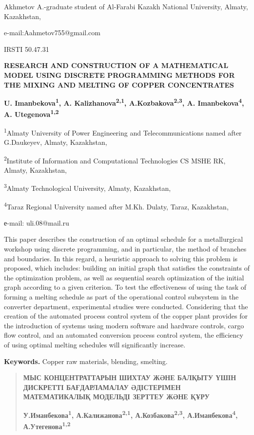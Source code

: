 Akhmetov A.-graduate student of Al-Farabi Kazakh National University,
Almaty, Kazakhstan,

e-mail:Aahmetov755@gmail.com

IRSTI 50.47.31

\textbf{RESEARCH AND CONSTRUCTION OF A MATHEMATICAL MODEL USING DISCRETE
PROGRAMMING METHODS FOR THE MIXING AND MELTING OF COPPER CONCENTRATES}

\textbf{U. Imanbekova\textsuperscript{1}, A.
Kalizhanova\textsuperscript{2,1}, A.Kozbakova\textsuperscript{2,3}, A.
Imanbekova\textsuperscript{4}, A. Utegenova\textsuperscript{1,2}}

\textsuperscript{1}Almaty University of Power Engineering and
Telecommunications named after G.Daukeyev, Almaty, Kazakhstan,

\textsuperscript{2}Institute of Information and Computational
Technologies CS MSHE RK, Almaty, Kazakhstan,

\textsuperscript{3}Almaty Technological University, Almaty, Kazakhstan,

\textsuperscript{4}Taraz Regional University named after M.Kh. Dulaty,
Taraz, Kazakhstan,

е-mail: uli.08@mail.ru

This paper describes the construction of an optimal schedule for a
metallurgical workshop using discrete programming, and in particular,
the method of branches and boundaries. In this regard, a heuristic
approach to solving this problem is proposed, which includes: building
an initial graph that satisfies the constraints of the optimization
problem, as well as sequential search optimization of the initial graph
according to a given criterion. To test the effectiveness of using the
task of forming a melting schedule as part of the operational control
subsystem in the converter department, experimental studies were
conducted. Considering that the creation of the automated process
control system of the copper plant provides for the introduction of
systems using modern software and hardware controls, cargo flow control,
and an automated conversion process control system, the efficiency of
using optimal melting schedules will significantly increase.

\textbf{Keywords.} Copper raw materials, blending, smelting.

\begin{quote}
\textbf{МЫС КОНЦЕНТРАТТАРЫН ШИХТАУ ЖӘНЕ БАЛҚЫТУ ҮШІН ДИСКРЕТТІ
БАҒДАРЛАМАЛАУ ӘДІСТЕРІМЕН МАТЕМАТИКАЛЫҚ МОДЕЛЬДІ ЗЕРТТЕУ ЖӘНЕ ҚҰРУ}

\textbf{У.Иманбекова\textsuperscript{1},
А.Калижанова\textsuperscript{2,1}, А.Козбакова\textsuperscript{2,3},
А.Иманбекова\textsuperscript{4}, А.Утегенова\textsuperscript{1,2}}
\end{quote}

